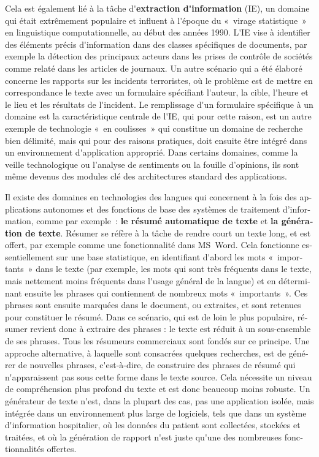 \begin{french}
\begin{multicols}{2}
Cela est également lié à la tâche d{\mbox '}{\bf extraction d{\mbox '}information}
(IE), un domaine qui était extrêmement populaire et influent à
l{\mbox '}époque du «~virage statistique~» en linguistique computationnelle,
au début des années 1990. L{\mbox '}IE vise à identifier des éléments précis
d{\mbox '}information dans des classes spécifiques de documents, par exemple
la détection des principaux acteurs dans les prises de contrôle de
sociétés comme relaté dans les articles de journaux. Un autre scénario
qui a été élaboré concerne les rapports sur les incidents terroristes,
où le problème est de mettre en correspondance le texte avec un
formulaire spécifiant l{\mbox '}auteur, la cible, l{\mbox '}heure et le lieu et les
résultats de l{\mbox '}incident. Le remplissage d{\mbox '}un formulaire spécifique à
un domaine est la caractéristique centrale de l{\mbox '}IE, qui pour cette
raison, est un autre exemple de technologie «~en coulisses~» qui
constitue un domaine de recherche bien délimité, mais qui pour des
raisons pratiques, doit ensuite être intégré dans un environnement
d{\mbox '}application approprié. Dans certains domaines, comme la veille technologique ou
l'analyse de sentiments ou la fouille d'opinions, ils sont même devenus des modules clé des
architectures standard des applications.

Il existe des domaines en technologies des langues qui concernent à la fois des applications autonomes et des fonctions de base des systèmes de traitement d'information, comme par exemple~: {\bf le résumé automatique de texte} et {\bf la génération de texte}. Résumer se réfère à la tâche de
rendre court un texte long, et est offert, par exemple comme une
fonctionnalité dans MS~Word. Cela fonctionne essentiellement sur une
base statistique, en identifiant d{\mbox '}abord les mots
«~importants~» dans le texte (par exemple, les mots qui sont très
fréquents dans le texte, mais nettement moins fréquents dans l{\mbox
  '}usage général de la langue) et en déterminant ensuite les phrases
qui contiennent de nombreux mots «~importants~». Ces phrases sont
ensuite marquées dans le document, ou extraites, et sont retenues pour
constituer le résumé. Dans ce scénario, qui est de loin le plus
populaire, résumer revient donc à extraire des phrases : le texte est
réduit à un sous-ensemble de ses phrases. Tous les résumeurs
commerciaux sont fondés sur ce principe. Une approche alternative, à laquelle
sont consacrées quelques recherches, est de générer de nouvelles
phrases, c{\mbox '}est-à-dire, de construire des phrases de résumé qui
n{\mbox '}apparaissent pas sous cette forme dans le texte source. Cela
nécessite un niveau de compréhension plus profond du texte et est donc
beaucoup moins robuste. Un générateur de texte n{\mbox '}est, dans la
plupart des cas, pas une application isolée, mais intégrée dans un
environnement plus large de logiciels, tels que dans un système
d{\mbox '}information hospitalier, où les données du patient sont
collectées, stockées et traitées, et où la génération de rapport
n{\mbox '}est juste qu{\mbox '}une des nombreuses fonctionnalités
offertes.


\end{multicols}
\end{french}
